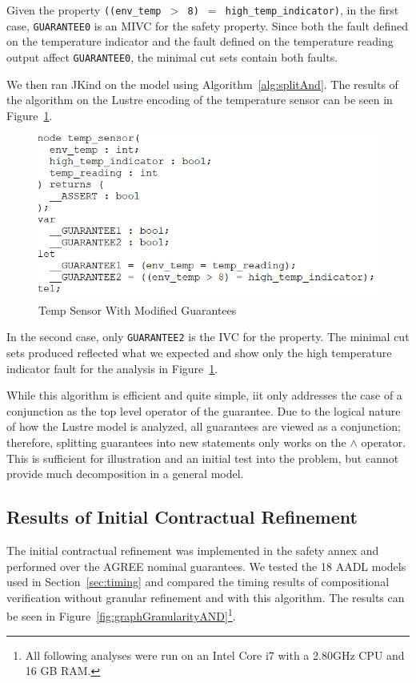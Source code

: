Given the property \texttt{((env\_temp $>$ 8) $=$ high\_temp\_indicator)}, in the first case, \texttt{GUARANTEE0} is an MIVC for the safety property. Since both the fault defined on the temperature indicator and the fault defined on the temperature reading output affect \texttt{GUARANTEE0}, the minimal cut sets contain both faults. 

We then ran JKind on the model using Algorithm~\ref{alg:splitAnd}. The results of the algorithm on the Lustre encoding of the temperature sensor can be seen in Figure~\ref{fig:lustreTwoGuar}. 

\begin{figure}[h!]
\begin{center}
\includegraphics[width=.8\textwidth]{images/lustreOneGuar.PNG}
\caption{Temp Sensor With Modified Guarantees} \label{fig:lustreTwoGuar}
\end{center}
\end{figure} 

 In the second case, only \texttt{GUARANTEE2} is the IVC for the property. The minimal cut sets produced reflected what we expected and show only the high temperature indicator fault for the analysis in Figure~\ref{fig:lustreTwoGuar}. 

While this algorithm is efficient and quite simple, iit only addresses the case of a conjunction as the top level operator of the guarantee. Due to the logical nature of how the Lustre model is analyzed, all guarantees are viewed as a conjunction; therefore, splitting guarantees into new statements only works on the $\land$ operator. This is sufficient for illustration and an initial test into the problem, but cannot provide much decomposition in a general model. 

\subsection{Results of Initial Contractual Refinement}
\label{sec:resultsAND}
The initial contractual refinement was implemented in the safety annex and performed over the AGREE nominal guarantees. We tested the 18 AADL models used in Section~\ref{sec:timing} and compared the timing results of compositional verification without granular refinement and with this algorithm. The results can be seen in Figure~\ref{fig:graphGranularityAND}\footnote{All following analyses were run on an Intel Core i7 with a 2.80GHz CPU and 16 GB RAM. }. 

